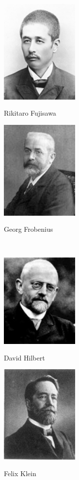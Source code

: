 \documentclass[11pt,a4j,twocolumn]{jarticle}
\begin{document}
\vfill
\noindent
\parbox[t]{39mm}{
\includegraphics[width=39mm,bb=0 0 120 160]{Fujisawa.jpg}\\
\centerline{Rikitaro Fujisawa}}\hfill
%
\parbox[t]{39mm}{
\includegraphics[width=39mm,bb=0 0 126 160]{Frobenius.jpg}\\
\centerline{Georg Frobenius}}\\

\bigskip\noindent
\parbox[t]{39mm}{
\includegraphics[width=39mm,bb=0 0 132 160]{Hilbert.jpg}\\
\centerline{David Hilbert}}\hfill
%
\parbox[t]{39mm}{
\includegraphics[width=39mm,bb=0 0 127 160]{Klein.jpg}\\
\centerline{Felix Klein}}
\end{document}
